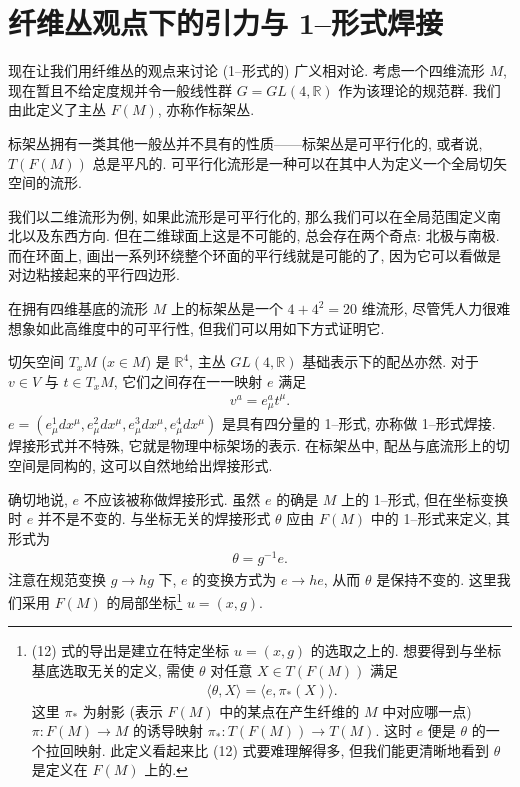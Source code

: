 \documentclass{article}
\begin{document}
\section{纤维丛观点下的引力与 1--形式焊接}
现在让我们用纤维丛的观点来讨论 (1--形式的) 广义相对论. 考虑一个四维流形 $M$, 现在暂且不给定度规并令一般线性群 $G=GL(4,\mathbb{R})$ 作为该理论的规范群. 我们由此定义了主丛 $F(M)$, 亦称作标架丛.
\par
标架丛拥有一类其他一般丛并不具有的性质——标架丛是可平行化的, 或者说, $T(F(M))$ 总是平凡的. 可平行化流形是一种可以在其中人为定义一个全局切矢空间的流形.
\par
我们以二维流形为例, 如果此流形是可平行化的, 那么我们可以在全局范围定义南北以及东西方向. 但在二维球面上这是不可能的, 总会存在两个奇点: 北极与南极. 而在环面上, 画出一系列环绕整个环面的平行线就是可能的了, 因为它可以看做是对边粘接起来的平行四边形.
\par
在拥有四维基底的流形 $M$ 上的标架丛是一个 $4+4^{2}=20$ 维流形, 尽管凭人力很难想象如此高维度中的可平行性, 但我们可以用如下方式证明它.
\par
切矢空间 $T_{x}M$ ($x\in M$) 是 $\mathbb{R}^{4}$, 主丛 $GL(4,\mathbb{R})$ 基础表示下的配丛亦然. 对于 $v\in V$ 与 $t\in T_{x}M$, 它们之间存在一一映射 $e$ 满足
\begin{align}
v^{a}=e^{a}_{\mu}t^{\mu}.
\end{align}
$e=(e_{\mu}^{1}dx^{\mu},e_{\mu}^{2}dx^{\mu},e_{\mu}^{3}dx^{\mu},e_{\mu}^{4}dx^{\mu})$ 是具有四分量的 1--形式, 亦称做 1--形式焊接. 焊接形式并不特殊, 它就是物理中标架场的表示. 在标架丛中, 配丛与底流形上的切空间是同构的, 这可以自然地给出焊接形式.
\par
确切地说, $e$ 不应该被称做焊接形式. 虽然 $e$ 的确是 $M$ 上的 1--形式, 但在坐标变换时 $e$ 并不是不变的. 与坐标无关的焊接形式 $\theta$ 应由 $F(M)$ 中的 1--形式来定义, 其形式为
\begin{align}
\theta=g^{-1}e.
\end{align}
注意在规范变换 $g\rightarrow hg$ 下, $e$ 的变换方式为 $e\rightarrow he$, 从而 $\theta$ 是保持不变的. 这里我们采用 $F(M)$ 的局部坐标\footnote{(12) 式的导出是建立在特定坐标 $u=(x,g)$ 的选取之上的. 想要得到与坐标基底选取无关的定义, 需使 $\theta$ 对任意 $X\in T(F(M))$ 满足
\begin{align}
\langle\theta,X\rangle=\langle e,\pi_{*}(X)\rangle.
\end{align}
这里 $\pi_{*}$ 为射影 (表示 $F(M)$ 中的某点在产生纤维的 $M$ 中对应哪一点) $\pi:F(M)\rightarrow M$ 的诱导映射 $\pi_{*}:T(F(M))\rightarrow T(M)$. 这时 $e$ 便是 $\theta$ 的一个拉回映射. 此定义看起来比 (12) 式要难理解得多, 但我们能更清晰地看到 $\theta$ 是定义在 $F(M)$ 上的.} $u=(x,g)$.
\end{document}
